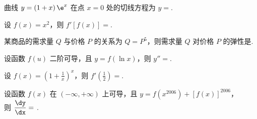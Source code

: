\begin{problem}
	曲线 $y = \left( 1 + x \right)\e^{x}$ 在点 $x = 0$ 处的切线方程为
$y =$.


\end{problem}           

\begin{problem}
设 $f\left( x \right) = x^{2}$，则
$f'\left[ f\left( x \right) \right] =$.


\end{problem}           

\begin{problem}
某商品的需求量 $Q$ 与价格 $P$ 的关系为 $Q = P^{5}$，则需求量
$Q$ 对价格 $P$ 的弹性是.


\end{problem}           

\begin{problem}
	设函数 $f\left( u \right)$ 二阶可导，且
$y = f\left( \ln x \right)$，则 $y'' =$.


\end{problem}           

\begin{problem}
	设 $\displaystyle f(x) = \left( 1 + \frac{1}{x} \right)^{x}$，则
$\displaystyle f'\left( \frac{1}{2} \right) =$.


\end{problem}           

\begin{problem}
设函数 $f(x)$ 在 $( - \infty, + \infty)$ 上可导，且
$y = f\left( x^{2006} \right) + \left[ f\left( x \right) \right]^{2006}$，\\
则
$\displaystyle \frac{\dy}{\dx} =$
.


\end{problem}           

